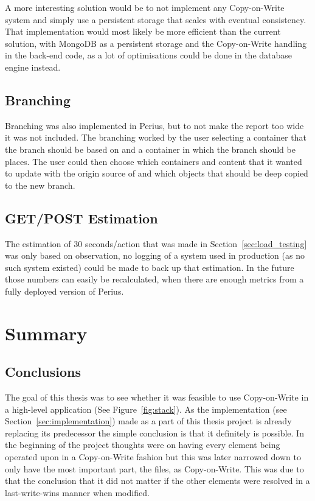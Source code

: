 \documentclass[a4paper,12pt]{article}
\begin{document}
\par A more interesting solution would be to not implement any Copy-on-Write system and simply use 
a persistent storage that scales with eventual consistency. That implementation would most likely be
more efficient than the current solution, with MongoDB as a persistent storage and the Copy-on-Write
handling in the back-end code, as a lot of optimisations could be done in the database engine
instead.

\subsection{Branching}
Branching was also implemented in Perius, but to not make the report too wide it was not included.
The branching worked by the user selecting a container that the branch should be based on and a
container in which the branch should be places. The user could then choose which containers and
content that it wanted to update with the origin source of and which objects that should be deep
copied to the new branch.

\subsection{GET/POST Estimation}
The estimation of 30 seconds/action that was made in Section~\ref{sec:load_testing} was only based
on observation, no logging of a system used in production (as no such system existed) could be made 
to back up that estimation. In the future those numbers can easily be recalculated, when there are
enough metrics from a fully deployed version of Perius.

\newpage
\section{Summary}
\subsection{Conclusions}
The goal of this thesis was to see whether it was feasible to use Copy-on-Write in a high-level
application (See Figure~\ref{fig:stack}). As the implementation (see
Section~\ref{sec:implementation}) made as a part of this thesis project is already replacing its
predecessor the simple conclusion is that it definitely is possible. In the beginning of the project
thoughts were on having every element being operated upon in a Copy-on-Write fashion but this was
later narrowed down to only have the most important part, the files, as Copy-on-Write. This was due
to that the conclusion that it did not matter if the other elements were resolved in a
last-write-wins manner when modified.
\end{document}

